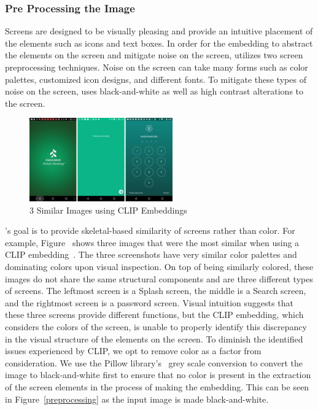 \subsubsection{Pre Processing the Image}
Screens are designed to be visually pleasing and provide an intuitive placement of the elements such as icons and text boxes. In order for the embedding to abstract the elements on the screen and mitigate noise on the screen, \FRAME utilizes two screen preprocessing techniques. Noise on the screen can take many forms such as color palettes, customized icon designs, and different fonts. To mitigate these types of noise on the screen, \FRAME uses black-and-white as well as high contrast alterations to the screen. 

\begin{figure}[h]
    \centering
    \includegraphics[width=0.55\textwidth]{imgs/3Clip.png}
    \caption{3 Similar Images using CLIP Embeddings}
    \label{3clip}
\end{figure}

\FRAME's goal is to provide skeletal-based similarity of screens rather than color. For example, Figure~ shows three images that were the most similar when using a CLIP embedding~\cite{clip}. The three screenshots have very similar color palettes and dominating colors upon visual inspection. On top of being similarly colored, these images do not share the same structural components and are three different types of screens. The leftmost screen is a Splash screen, the middle is a Search screen, and the rightmost screen is a password screen. Visual intuition suggests that these three screens provide different functions, but the CLIP embedding, which considers the colors of the screen, is unable to properly identify this discrepancy in the visual structure of the elements on the screen. To diminish the identified issues experienced by CLIP, we opt to remove color as a factor from consideration. We use the Pillow library's~\cite {pillow} grey scale conversion to convert the image to black-and-white first to ensure that no color is present in the extraction of the screen elements in the process of making the embedding. This can be seen in Figure~\ref{preprocessing} as the input image is made black-and-white. 


